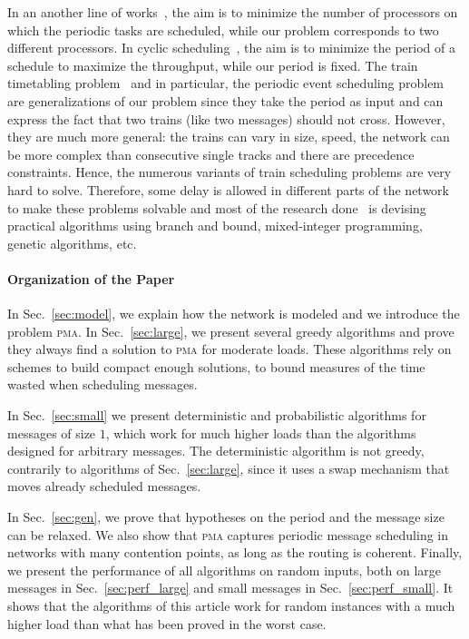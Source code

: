 \documentclass[a4paper,UKenglish,cleveref, autoref, thm-restate]{lipics-v2019}
\newcommand\pma{\textsc{pma}\xspace}
\begin{document}
 In an another line of works~\cite{korst1991periodic,hanen1993cyclic}, the aim is to minimize the number of processors on which the periodic tasks are scheduled, while our problem corresponds to two different processors. In cyclic scheduling~\cite{levner2010complexity}, the aim is to minimize the period of a schedule to maximize the throughput, while our period is fixed. The train timetabling problem~\cite{lusby2011railway} and in particular, the periodic event scheduling problem~\cite{serafini1989mathematical} are generalizations of our problem since they take the period as input and can express the fact that two trains (like two messages) should not cross. However, they are much more general: the trains can vary in size, speed, the network can be more complex than consecutive single tracks and there are precedence constraints. Hence, the numerous variants of train scheduling problems are very hard to solve. Therefore, some delay is allowed in different parts of the network to make these problems solvable and most of the research done~\cite{lusby2011railway} is devising practical algorithms using branch and bound, mixed-integer programming, genetic algorithms, etc. 
 

\paragraph*{Organization of the Paper}

In Sec.~\ref{sec:model}, we explain how the network is modeled and we introduce the problem \pma. In Sec.~\ref{sec:large}, we present several greedy algorithms and prove they always find a solution to \pma for moderate loads. 
These algorithms rely on schemes to build compact enough solutions, to bound measures of the time wasted when scheduling messages. 

In Sec.~\ref{sec:small} we present deterministic and probabilistic algorithms for messages of size $1$, which work for much higher loads than the algorithms designed for arbitrary messages. The deterministic algorithm is not greedy, contrarily to algorithms of Sec.~\ref{sec:large}, since it uses a swap mechanism that moves already scheduled messages. 

In Sec.~\ref{sec:gen}, we prove that hypotheses on the period and the message size can be relaxed. We also show that \pma captures periodic message scheduling in networks with many contention points, as long as the routing is coherent.
Finally, we present the performance of all algorithms on random inputs, both on large messages in Sec.~\ref{sec:perf_large} and small messages in Sec.~\ref{sec:perf_small}.
It shows that the algorithms of this article work for random instances with a much higher load than what has been proved in the worst case.
\end{document}
